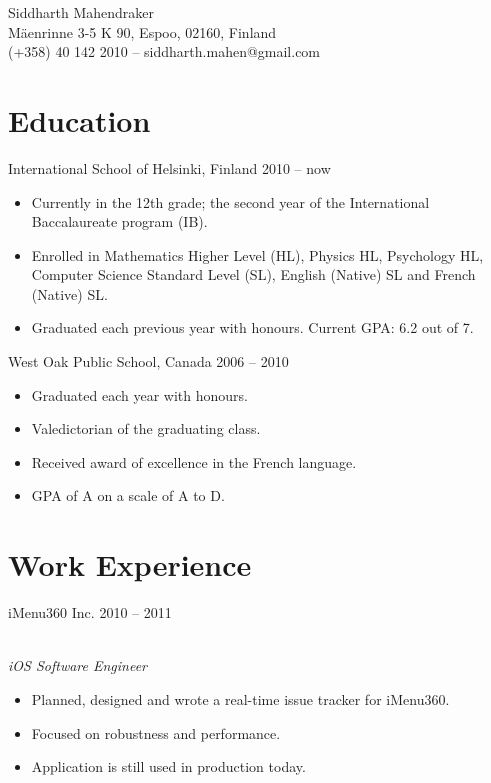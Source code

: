 \documentclass[a4paper,11pt]{article}
\newcommand{\hdr}[2]{{\raggedright\Large #1 \hfill #2}}
\newcommand{\itm}{\item[--]}
\begin{document}
\begin{center}
\begin{scshape}
{\huge\sffamily Siddharth Mahendraker}\\
\bigskip
\textsf{Mäenrinne 3-5 K 90, Espoo, 02160, Finland}\\
\medskip
\textsf{(+358) 40 142 2010 – siddharth.mahen@gmail.com}
\end{scshape}
\end{center}

\section{Education}
\hdr{International School of Helsinki, Finland}{2010 -- now}
\begin{itemize}
    \itm Currently in the 12th grade; the second year of the International
    Baccalaureate program (IB).
    \itm Enrolled in Mathematics Higher Level (HL), Physics HL, Psychology HL,
    Computer Science Standard Level (SL), English (Native) SL and French (Native)
    SL.
    \itm Graduated each previous year with honours. Current GPA: 6.2 out of 7.
\end{itemize}
\bigskip
\hdr{West Oak Public School, Canada}{2006 -- 2010}
\begin{itemize}
    \itm Graduated each year with honours.
    \itm Valedictorian of the graduating class.
    \itm Received award of excellence in the French language.
    \itm GPA of A on a scale of A to D.
\end{itemize}
\section{Work Experience}
\hdr{iMenu360 Inc.}{2010 -- 2011}\\[2mm]
\emph{\large iOS Software Engineer}
\begin{itemize}
    \itm Planned, designed and wrote a real-time issue tracker for
    iMenu360.
    \itm Focused on robustness and performance.
    \itm Application is still used in production today.
\end{itemize}
\end{document}
